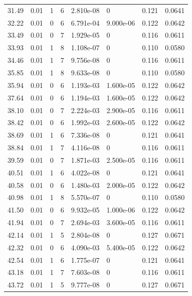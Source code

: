 \documentclass[preview]{standalone}
\begin{document}
{{{\begin{tabular}{L{1.2cm}C{1.2cm} C{0.3cm}C{0.5cm} C{1.4cm}C{1.4cm} C{1.4cm}C{1.4cm}}
  31.49  &  0.01  & 1     &  6 &  2.810e-08  & 0  & 0.121 &  0.0641   \\ 
  32.22  &  0.01  & 0     &  6 &  6.791e-04  & 9.000e-06  & 0.122 &  0.0642   \\ 
  33.49  &  0.01  & 0     &  7 &  1.929e-05  & 0  & 0.116 &  0.0611   \\ 
  33.93  &  0.01  & 1     &  8 &  1.108e-07  & 0  & 0.110 &  0.0580   \\ 
  34.46  &  0.01  & 1     &  7 &  9.756e-08  & 0  & 0.116 &  0.0611   \\ 
  35.85  &  0.01  & 1     &  8 &  9.633e-08  & 0  & 0.110 &  0.0580   \\ 
  35.94  &  0.01  & 0     &  6 &  1.193e-03  & 1.600e-05  & 0.122 &  0.0642   \\ 
  37.64  &  0.01  & 0     &  6 &  1.194e-03  & 1.600e-05  & 0.122 &  0.0642   \\ 
  38.10  &  0.01  & 0     &  7 &  2.224e-03  & 2.900e-05  & 0.116 &  0.0611   \\ 
  38.42  &  0.01  & 0     &  6 &  1.992e-03  & 2.600e-05  & 0.122 &  0.0642   \\ 
  38.69  &  0.01  & 1     &  6 &  7.336e-08  & 0  & 0.121 &  0.0641   \\ 
  38.84  &  0.01  & 1     &  7 &  4.116e-08  & 0  & 0.116 &  0.0611   \\ 
  39.59  &  0.01  & 0     &  7 &  1.871e-03  & 2.500e-05  & 0.116 &  0.0611   \\ 
  40.51  &  0.01  & 1     &  6 &  4.022e-08  & 0  & 0.121 &  0.0641   \\ 
  40.58  &  0.01  & 0     &  6 &  1.480e-03  & 2.000e-05  & 0.122 &  0.0642   \\ 
  40.98  &  0.01  & 1     &  8 &  5.570e-07  & 0  & 0.110 &  0.0580   \\ 
  41.50  &  0.01  & 0     &  6 &  9.932e-05  & 1.000e-06  & 0.122 &  0.0642   \\ 
  41.94  &  0.01  & 0     &  7 &  2.694e-03  & 3.600e-05  & 0.116 &  0.0611   \\ 
  42.14  &  0.01  & 1     &  5 &  2.804e-08  & 0  & 0.127 &  0.0671   \\ 
  42.32  &  0.01  & 0     &  6 &  4.090e-03  & 5.400e-05  & 0.122 &  0.0642   \\ 
  42.54  &  0.01  & 1     &  6 &  1.775e-07  & 0  & 0.121 &  0.0641   \\ 
  43.18  &  0.01  & 1     &  7 &  7.603e-08  & 0  & 0.116 &  0.0611   \\ 
  43.72  &  0.01  & 1     &  5 &  9.777e-08  & 0  & 0.127 &  0.0671   \\ 

\end{tabular}}}}
\end{document}
